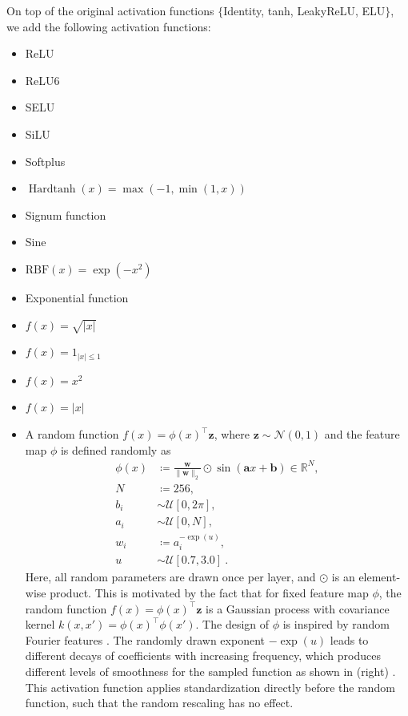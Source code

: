 \documentclass{article}
\theoremstyle{plain}
\theoremstyle{definition}
\theoremstyle{remark}
\begin{document}
On top of the original activation functions $\{$Identity, tanh, LeakyReLU, ELU$\}$, we add the following activation functions:
\begin{itemize}
    \item ReLU
    \item ReLU6 \citep{krizhevsky2010convolutional}
    \item SELU \citep{klambauer2017self}
    \item SiLU \citep{hendrycks2016gaussian}
    \item Softplus
    \item $\operatorname{Hardtanh}(x) = \max(-1, \min(1, x))$
    \item Signum function
    \item Sine
    \item $\mathrm{RBF}(x) = \exp(-x^2)$
    \item Exponential function
    \item $f(x) = \sqrt{|x|}$
    \item $f(x) = 1_{|x| \leq 1}$
    \item $f(x) = x^2$
    \item $f(x) = |x|$
    \item A random function $f(x) = \phi(x)^\top \mathbf{z}$, where $\mathbf{z} \sim \mathcal{N}(0, 1)$ and the feature map $\phi$ is defined randomly as
    \begin{align*}
        \phi(x) & \coloneqq \frac{\mathbf{w}}{\|\mathbf{w}\|_2} \odot \sin(\mathbf{a}x + \mathbf{b}) \in \mathbb{R}^N, \\
        N &\coloneqq 256, \\
        b_i &\sim \mathcal{U}[0, 2\pi], \\
        a_i &\sim \mathcal{U}[0, N], \\
        w_i &\coloneqq a_i^{-\exp(u)}, \\
        u &\sim \mathcal{U}[0.7, 3.0]~.
    \end{align*}
    Here, all random parameters are drawn once per layer, and $\odot$ is an element-wise product. This is motivated by the fact that for fixed feature map $\phi$, the random function $f(x) = \phi(x)^\top \mathbf{z}$ is a Gaussian process with covariance kernel $k(x, x') = \phi(x)^\top \phi(x')$. The design of $\phi$ is inspired by random Fourier features \citep{rahimi2007random}. The randomly drawn exponent $-\exp(u)$ leads to different decays of coefficients with increasing frequency, which produces different levels of smoothness for the sampled function as shown in  (right) \citep{da2023sample}. This activation function applies standardization directly before the random function, such that the random rescaling has no effect.

\end{itemize}
\end{document}
